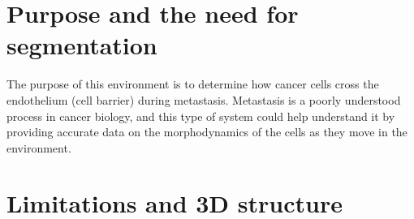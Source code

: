 \section{Purpose and the need for segmentation}

The purpose of this environment is to determine how cancer cells cross the endothelium (cell barrier) during metastasis. Metastasis is a poorly understood process in cancer biology, and this type of system could help understand it by providing accurate data on the morphodynamics of the cells as they move in the environment.

\section{Limitations and 3D structure}
